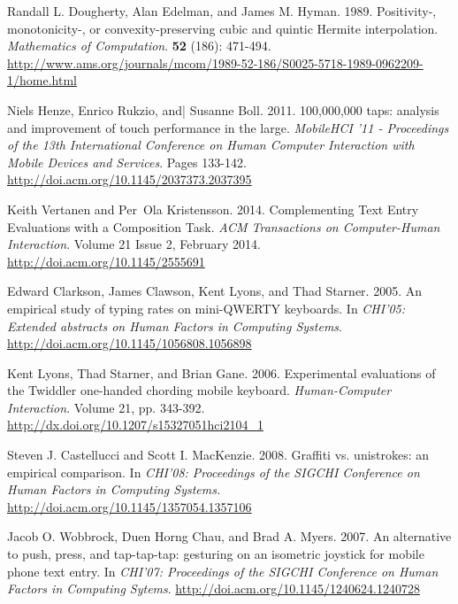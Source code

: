 \documentclass[final,1p,times,authoryear]{elsarticle}
\begin{document}
\begin{thebibliography}{00}
{Randall L. Dougherty}, {Alan Edelman}, {and} {James M. Hyman}. 1989.
Positivity-, monotonicity-, or convexity-preserving cubic and quintic Hermite interpolation.
{\em Mathematics of Computation}. \textbf{52} (186): 471-494.
\url{http://www.ams.org/journals/mcom/1989-52-186/S0025-5718-1989-0962209-1/home.html}


{Niels Henze}, {Enrico Rukzio}, {and|} {Susanne Boll}. 2011.
100,000,000 taps: analysis and improvement of touch performance in the large.
{\em MobileHCI '11 - Proceedings of the 13th International Conference on Human Computer
Interaction with Mobile Devices and Services}. Pages 133-142.
\url{http://doi.acm.org/10.1145/2037373.2037395}


{Keith Vertanen} {and} {Per~Ola Kristensson}. 2014.
Complementing Text Entry Evaluations with a Composition Task.
{\em ACM Transactions on Computer-Human Interaction}. Volume 21 Issue 2, February 2014.
\url{http://doi.acm.org/10.1145/2555691}


{Edward Clarkson}, {James Clawson}, {Kent Lyons}, {and} {Thad Starner}. 2005.
An empirical study of typing rates on mini-QWERTY keyboards.
In {\em CHI'05: Extended abstracts on Human Factors in Computing Systems}.
\url{http://doi.acm.org/10.1145/1056808.1056898}


{Kent Lyons}, {Thad Starner}, {and} {Brian Gane}. 2006.
Experimental evaluations of the Twiddler one-handed chording mobile keyboard.
{\em Human-Computer Interaction}. Volume 21, pp. 343-392.
\url{http://dx.doi.org/10.1207/s15327051hci2104_1}


{Steven J. Castellucci} {and} {Scott I. MacKenzie}. 2008.
Graffiti vs. unistrokes: an empirical comparison.
In {\em CHI'08: Proceedings of the SIGCHI Conference on Human Factors in Computing Systems.}
\url{http://doi.acm.org/10.1145/1357054.1357106}


{Jacob O. Wobbrock}, {Duen Horng Chau}, {and} {Brad A. Myers}. 2007.
An alternative to push, press, and tap-tap-tap: gesturing on an isometric joystick for mobile phone text entry.
In {\em CHI'07: Proceedings of the SIGCHI Conference on Human Factors in Computing Sytems}.
\url{http://doi.acm.org/10.1145/1240624.1240728}


\end{thebibliography}
\end{document}
